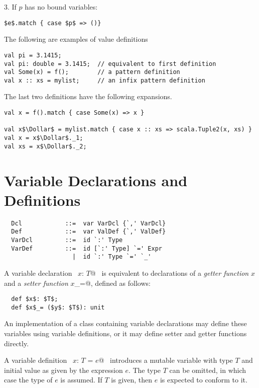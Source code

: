 \documentclass[a4paper,12pt,twoside,titlepage]{book}
\begin{document}
3. If $p$ has no bound variables:
\begin{lstlisting}
$e$.match { case $p$ => ()}
\end{lstlisting}

\example
The following are examples of value definitions
\begin{lstlisting}
val pi = 3.1415;
val pi: double = 3.1415;  // equivalent to first definition
val Some(x) = f();        // a pattern definition
val x :: xs = mylist;     // an infix pattern definition
\end{lstlisting}

The last two definitions have the following expansions.
\begin{lstlisting}
val x = f().match { case Some(x) => x }

val x$\Dollar$ = mylist.match { case x :: xs => scala.Tuple2(x, xs) }
val x = x$\Dollar$._1;
val xs = x$\Dollar$._2;
\end{lstlisting}

\section{Variable Declarations and Definitions}
\label{sec:vardef}

\syntax\begin{lstlisting}
  Dcl            ::=  var VarDcl {`,' VarDcl}
  Def            ::=  var ValDef {`,' ValDef}
  VarDcl         ::=  id `:' Type
  VarDef         ::=  id [`:' Type] `=' Expr
                   |  id `:' Type `=' `_'
\end{lstlisting}

A variable declaration ~\lstinline@var $x$: $T$@~ is equivalent to declarations
of a {\em getter function} $x$ and a {\em setter function}
\lstinline@$x$_=@, defined as follows:

\begin{lstlisting}
  def $x$: $T$;
  def $x$_= ($y$: $T$): unit
\end{lstlisting}

An implementation of a class containing variable declarations
may define these variables using variable definitions, or it may
define setter and getter functions directly.

A variable definition ~\lstinline@var $x$: $T$ = $e$@~ introduces a mutable
variable with type $T$ and initial value as given by the
expression $e$. The type $T$ can be omitted, 
in which case the type of $e$ is assumed. If $T$ is given, then $e$ 
is expected to conform to it.
\end{document}
